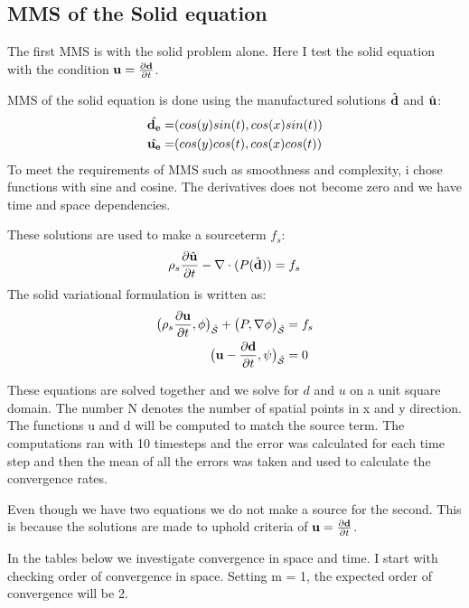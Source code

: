 \subsection{MMS of the Solid equation }
The first MMS is with the solid problem alone. Here I test the solid equation with the condition $\bold{u} = \frac{\partial \bold{d}}{\partial t}$.\newline

MMS of the solid equation is done using the manufactured solutions $\hat{\bold{d}}$ and $\hat{\bold{u}}$: 
\begin{align*}
\hat{\bold{d_e}} =& ( cos(y)sin(t) , cos(x)sin(t) )\\
\hat{\bold{u_e}} =& ( cos(y)cos(t), cos(x)cos(t) )
\end{align*}
To meet the requirements of MMS such as smoothness and complexity, i chose functions with sine and cosine. The derivatives does not become zero and we have time and space dependencies. 
\newline

These solutions are used to make a sourceterm $f_s$:
$$\rho_s \frac{\partial \hat{\bold{u}}}{\partial t} - \nabla \cdot ( P(\hat{\bold{d}}) ) = f_s $$
The solid variational formulation is written as:
\begin{align}
\big(\rho_s \frac{\partial \bold{u}}{\partial t},\phi \big)_{\mathcal{\hat{S}}} + \big(P, \nabla \phi \big)_{\mathcal{\hat{S}}} &=f_s \\
\big( \bold{u}- \frac{\partial \bold{d}}{\partial t} ,\psi \big)_{\mathcal{\hat{S}}} &= 0 
\end{align}

These equations are solved together and we solve for $d$ and $u$ on a unit square domain. The number N denotes the number of spatial points in x and y direction. The functions u and d will be computed to match the source term. 
The computations ran with 10 timesteps and the error was calculated for each time step and then the mean of all the errors was taken and used to calculate the convergence rates.

Even though we have two equations we do not make a source for the second. This is because the solutions are made to uphold criteria of $\bold{u} = \frac{\partial \bold{d}}{\partial t}$.\newline

In the tables below we investigate convergence in space and time.
I start with checking order of convergence in space. Setting m = 1, the expected order of convergence will be 2. 

